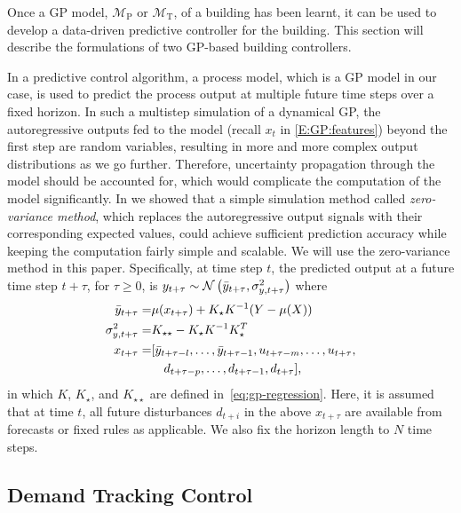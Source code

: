 Once a GP model, $\mathcal{M}_{\mathrm{P}}$ or $\mathcal{M}_{\mathrm{T}}$, of a building has been learnt, it can be used to develop a data-driven predictive controller for the building.
This section will describe the formulations of two GP-based building controllers.

In a predictive control algorithm, a process model, which is a GP model in our case, is used to predict the process output at multiple future time steps over a fixed horizon.
In such a multistep simulation of a dynamical GP, the autoregressive outputs fed to the model (recall $x_{t}$ in \eqref{E:GP:features}) beyond the first step are random variables, resulting in more and more complex output distributions as we go further.
Therefore, uncertainty propagation through the model should be accounted for, which would complicate the computation of the model significantly.
In \cite{nghiemetal16gp} we showed that a simple simulation method called \emph{zero-variance method}, which replaces the autoregressive output signals with their corresponding expected values, could achieve sufficient prediction accuracy while keeping the computation fairly simple and scalable.
We will use the zero-variance method in this paper.
Specifically, at time step $t$, the predicted output at a future time step $t+\tau$, for $\tau \geq 0$, is $y_{t+\tau} \sim \operatorname*{\mathcal{N}}\left(\bar{y}_{t+\tau}, \sigma^2_{y, t+\tau}\right)$ where
\begin{align}
  \label{eq:mean-variance-dynamics}
  \bar{y}_{t+\tau} =& \mu(x_{t+\tau}) + K_\star K^{-1} (Y - \mu(X)) \\
  \sigma^2_{y,t+\tau} =& K_{\star \star} - K_\star K^{-1} K_\star^T \nonumber \\
  x_{t + \tau} =& [\bar y_{t+ \tau-l}, \dots, \bar y_{t+ \tau-1}, u_{t+ \tau-m}, \dots, u_{t+ \tau}, \nonumber \\
                      & \quad d_{t+ \tau-p}, \dots, d_{t+ \tau-1}, d_{t+ \tau}]\text, \nonumber
\end{align}
in which $K$, $K_{\star}$, and $K_{\star\star}$ are defined in~\eqref{eq:gp-regression}.
Here, it is assumed that at time \(t\), all future disturbances \(d_{t+i}\) in the above $x_{t+\tau}$ are available from forecasts or fixed rules as applicable.
We also fix the horizon length to $N$ time steps.


\subsection{Demand Tracking Control}


